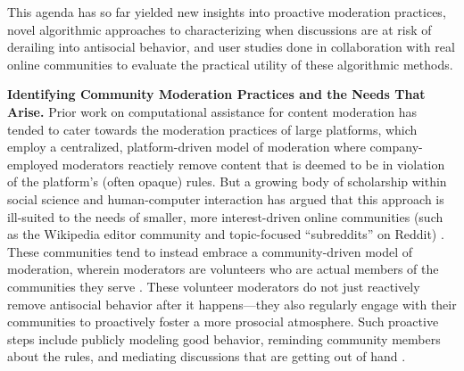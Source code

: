 \documentclass[11pt,letterpaper]{article}
\renewcommand{\section}[1]{\vspace{0.25\baselineskip}\noindent\textbf{#1.}}
\begin{document}
This agenda has so far yielded new insights into proactive moderation practices, novel algorithmic approaches to characterizing when discussions are at risk of derailing into antisocial behavior, and user studies done in collaboration with real online communities to evaluate the practical utility of these algorithmic methods.

\section{Identifying Community Moderation Practices and the Needs That Arise}
Prior work on computational assistance for content moderation has tended to cater towards the moderation practices of large platforms, which employ a centralized, platform-driven model of moderation where company-employed moderators reactiely remove content that is deemed to be in violation of the platform's (often opaque) rules.
But a growing body of scholarship within social science and human-computer interaction has argued that this approach is ill-suited to the needs of smaller, more interest-driven online communities (such as the Wikipedia editor community and topic-focused ``subreddits'' on Reddit) \cite{jurgens_just_2019,seering_reconsidering_2020}.
These communities tend to instead embrace a community-driven model of moderation, wherein moderators are volunteers who are actual members of the communities they serve \cite{lo_when_2018}.
These volunteer moderators do not just reactively remove antisocial behavior after it happens---they also regularly engage with their communities to proactively foster a more prosocial atmosphere.
Such proactive steps include publicly modeling good behavior, reminding community members about the rules, and mediating discussions that are getting out of hand \cite{seering_shaping_2017,cai_what_2019,billings_understanding_2010}.
\end{document}

